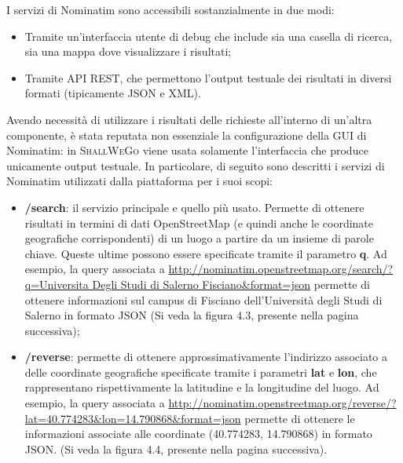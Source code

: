         I servizi di Nominatim sono accessibili sostanzialmente in due modi: 
        
        \begin{itemize}
            \item Tramite un'interfaccia utente di debug che include sia una casella di ricerca, sia una mappa dove visualizzare i risultati;
            \item Tramite API REST, che permettono l'output testuale dei risultati in diversi formati (tipicamente JSON e XML).
        \end{itemize}

        Avendo necessità di utilizzare i risultati delle richieste all’interno di un’altra componente, è stata reputata non essenziale la configurazione della GUI di Nominatim: in \textsc{ShallWeGo} viene usata solamente l'interfaccia che produce unicamente output testuale.
        In particolare, di seguito sono descritti i servizi di Nominatim utilizzati dalla piattaforma per i suoi scopi:

        \begin{itemize}
            \item \textbf{/search}: il servizio principale e quello più usato. Permette di ottenere risultati in termini di dati OpenStreetMap (e quindi anche le coordinate geografiche corrispondenti) di un luogo a partire da un insieme di parole chiave. Queste ultime possono essere specificate tramite il parametro \textbf{q}. Ad esempio, la query associata a  \url{http://nominatim.openstreetmap.org/search/?q=Universita Degli Studi di Salerno Fisciano&format=json} permette di ottenere informazioni sul campus di Fisciano dell'Università degli Studi di Salerno in formato JSON (Si veda la figura 4.3, presente nella pagina successiva);
            \newpage
            \item \textbf{/reverse}: permette di ottenere approssimativamente l'indirizzo associato a delle coordinate geografiche specificate tramite i parametri \textbf{lat} e \textbf{lon}, che rappresentano rispettivamente la latitudine e la longitudine del luogo. Ad esempio, la query associata a \url{http://nominatim.openstreetmap.org/reverse/?lat=40.774283&lon=14.790868&format=json} permette di ottenere le informazioni associate alle coordinate (40.774283, 14.790868) in formato JSON. (Si veda la figura 4.4, presente nella pagina successiva).
        \end{itemize}

